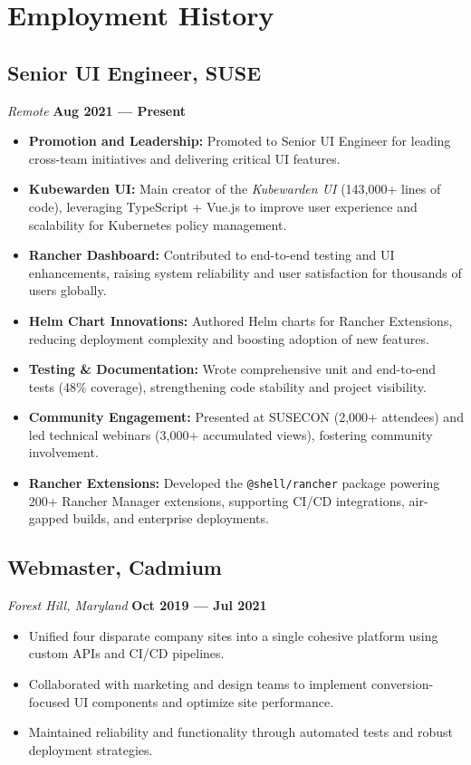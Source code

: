 \documentclass[a4paper,10pt]{article}
\begin{document}
\section*{Employment History}

\subsection*{Senior UI Engineer, SUSE}
\textit{Remote} \hfill \textbf{Aug 2021 — Present}
\begin{itemize}[leftmargin=1.5em]
    \item \textbf{Promotion and Leadership:} Promoted to Senior UI Engineer for leading cross-team initiatives and delivering critical UI features.
    \item \textbf{Kubewarden UI:} Main creator of the \textit{Kubewarden UI} (143,000+ lines of code), leveraging TypeScript + Vue.js to improve user experience and scalability for Kubernetes policy management.
    \item \textbf{Rancher Dashboard:} Contributed to end-to-end testing and UI enhancements, raising system reliability and user satisfaction for thousands of users globally.
    \item \textbf{Helm Chart Innovations:} Authored Helm charts for Rancher Extensions, reducing deployment complexity and boosting adoption of new features.
    \item \textbf{Testing \& Documentation:} Wrote comprehensive unit and end-to-end tests (48\% coverage), strengthening code stability and project visibility.
    \item \textbf{Community Engagement:} Presented at SUSECON (2,000+ attendees) and led technical webinars (3,000+ accumulated views), fostering community involvement.
    \item \textbf{Rancher Extensions:} Developed the \texttt{@shell/rancher} package powering 200+ Rancher Manager extensions, supporting CI/CD integrations, air-gapped builds, and enterprise deployments.
\end{itemize}

\subsection*{Webmaster, Cadmium}
\textit{Forest Hill, Maryland} \hfill \textbf{Oct 2019 — Jul 2021}
\begin{itemize}[leftmargin=1.5em]
    \item Unified four disparate company sites into a single cohesive platform using custom APIs and CI/CD pipelines.
    \item Collaborated with marketing and design teams to implement conversion-focused UI components and optimize site performance.
    \item Maintained reliability and functionality through automated tests and robust deployment strategies.
\end{itemize}
\end{document}
